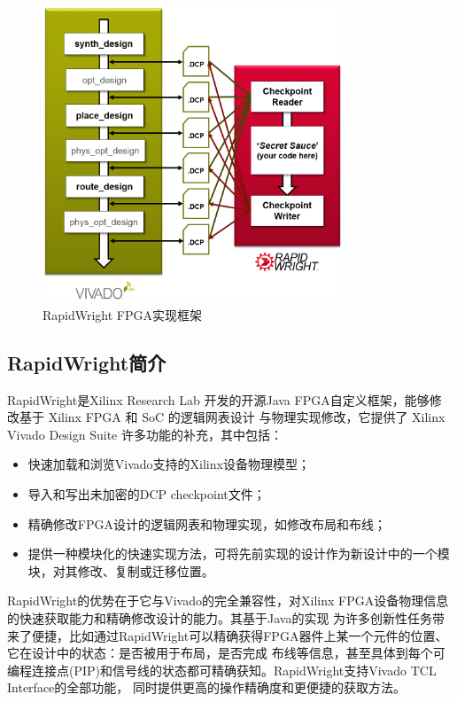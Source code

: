 \begin{figure}[h]
	\centering
	\includegraphics[width=0.8\textwidth]{figure/vivado_dcps}
	\caption{RapidWright FPGA实现框架} 
	\label{fig:rapidwright}
\end{figure}

\subsection{RapidWright简介}

RapidWright是Xilinx Research Lab 开发的开源Java FPGA自定义框架，能够修改基于 Xilinx FPGA 和 SoC 的逻辑网表设计
与物理实现修改，它提供了 Xilinx Vivado Design Suite 许多功能的补充，其中包括：
\begin{itemize}
    \item 快速加载和浏览Vivado支持的Xilinx设备物理模型；
    \item 导入和写出未加密的DCP checkpoint文件；
    \item 精确修改FPGA设计的逻辑网表和物理实现，如修改布局和布线；
    \item 提供一种模块化的快速实现方法，可将先前实现的设计作为新设计中的一个模块，对其修改、复制或迁移位置。
\end{itemize}

RapidWright的优势在于它与Vivado的完全兼容性，对Xilinx FPGA设备物理信息的快速获取能力和精确修改设计的能力。其基于Java的实现
为许多创新性任务带来了便捷，比如通过RapidWright可以精确获得FPGA器件上某一个元件的位置、它在设计中的状态：是否被用于布局，是否完成
布线等信息，甚至具体到每个可编程连接点(PIP)和信号线的状态都可精确获知。RapidWright支持Vivado TCL Interface的全部功能，
同时提供更高的操作精确度和更便捷的获取方法。

